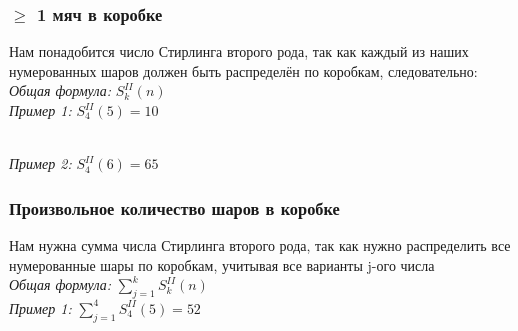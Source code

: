 \documentclass{article}
\begin{document}
            \subsubsection{$\ge$ 1 мяч в коробке}
                Нам понадобится число Стирлинга второго рода, так как каждый из наших нумерованных шаров должен быть распределён по коробкам, следовательно:\\
                \textit{Общая формула:} $ S^{II}_{k}(n) $\\
                \textit{Пример 1:} $ S^{II}_{4}(5) = 10 $
                \begin{figure}[h!]
                \end{figure}\\
                \newpage
                \textit{Пример 2:} $ S^{II}_{4}(6) = 65 $
                \begin{figure}[h!]
                \end{figure}
            \hypertarget{2b3}{\subsubsection{Произвольное количество шаров в коробке}}
                Нам нужна сумма числа Стирлинга второго рода, так как нужно распределить все нумерованные шары по коробкам, учитывая все варианты j-ого числа\\
                \textit{Общая формула:} $ \sum\limits_{j=1}^{k} S^{II}_{k}(n) $\\
                \textit{Пример 1:} $ \sum\limits_{j=1}^{4} S^{II}_{4}(5) = 52 $
                \begin{figure}[h!]
                \end{figure}\\
\end{document}
